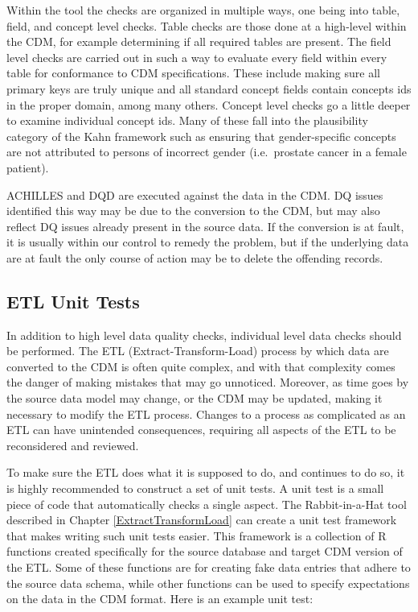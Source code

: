 \documentclass[11pt]{book}
\theoremstyle{definition}
\theoremstyle{definition}
\theoremstyle{definition}
\theoremstyle{remark}
\let\BeginKnitrBlock\begin \let\EndKnitrBlock\end
\begin{document}
Within the tool the checks are organized in multiple ways, one being
into table, field, and concept level checks. Table checks are those done
at a high-level within the CDM, for example determining if all required
tables are present. The field level checks are carried out in such a way
to evaluate every field within every table for conformance to CDM
specifications. These include making sure all primary keys are truly
unique and all standard concept fields contain concepts ids in the
proper domain, among many others. Concept level checks go a little
deeper to examine individual concept ids. Many of these fall into the
plausibility category of the Kahn framework such as ensuring that
gender-specific concepts are not attributed to persons of incorrect
gender (i.e.~prostate cancer in a female patient).

\BeginKnitrBlock{rmdimportant}
ACHILLES and DQD are executed against the data in the CDM. DQ issues
identified this way may be due to the conversion to the CDM, but may
also reflect DQ issues already present in the source data. If the
conversion is at fault, it is usually within our control to remedy the
problem, but if the underlying data are at fault the only course of
action may be to delete the offending records.
\EndKnitrBlock{rmdimportant}

\subsection{ETL Unit Tests}\label{etlUnitTests}


In addition to high level data quality checks, individual level data
checks should be performed. The ETL (Extract-Transform-Load) process by
which data are converted to the CDM is often quite complex, and with
that complexity comes the danger of making mistakes that may go
unnoticed. Moreover, as time goes by the source data model may change,
or the CDM may be updated, making it necessary to modify the ETL
process. Changes to a process as complicated as an ETL can have
unintended consequences, requiring all aspects of the ETL to be
reconsidered and reviewed.

To make sure the ETL does what it is supposed to do, and continues to do
so, it is highly recommended to construct a set of unit tests. A unit
test is a small piece of code that automatically checks a single aspect.
The Rabbit-in-a-Hat tool described in Chapter \ref{ExtractTransformLoad}
can create a unit test framework that makes writing such unit tests
easier. This framework is a collection of R functions created
specifically for the source database and target CDM version of the ETL.
Some of these functions are for creating fake data entries that adhere
to the source data schema, while other functions can be used to specify
expectations on the data in the CDM format. Here is an example unit
test:
\end{document}
